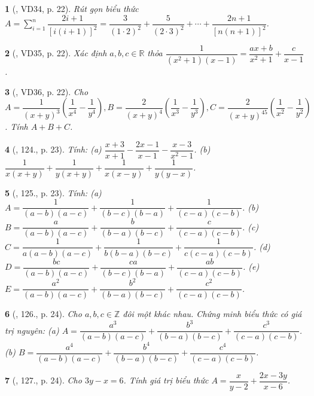\documentclass{article}
\newtheorem{baitoan}{}
\begin{document}
\begin{baitoan}[\cite{Binh_Toan_8_tap_1}, VD34, p. 22]
	Rút gọn biểu thức $A = \sum_{i=1}^n \dfrac{2i + 1}{[i(i + 1)]^2} = \dfrac{3}{(1\cdot2)^2} + \dfrac{5}{(2\cdot3)^2} + \cdots + \dfrac{2n + 1}{[n(n + 1)]^2}$.
\end{baitoan}

\begin{baitoan}[\cite{Binh_Toan_8_tap_1}, VD35, p. 22]
	Xác định $a,b,c\in\mathbb{R}$ thỏa $\dfrac{1}{(x^2 + 1)(x - 1)} = \dfrac{ax + b}{x^2 + 1} + \dfrac{c}{x - 1}$.
\end{baitoan}

\begin{baitoan}[\cite{Binh_Toan_8_tap_1}, VD36, p. 22]
	Cho $A = \dfrac{1}{(x + y)^3}\left(\dfrac{1}{x^4} - \dfrac{1}{y^4}\right),B = \dfrac{2}{(x + y)^4}\left(\dfrac{1}{x^3} - \dfrac{1}{y^3}\right),C = \dfrac{2}{(x + y)^45}\left(\dfrac{1}{x^2} - \dfrac{1}{y^2}\right)$. Tính $A + B + C$.
\end{baitoan}

\begin{baitoan}[\cite{Binh_Toan_8_tap_1}, 124., p. 23]
	Tính: (a) $\dfrac{x + 3}{x + 1} - \dfrac{2x - 1}{x - 1} - \dfrac{x - 3}{x^2 - 1}$. (b) $\dfrac{1}{x(x + y)} + \dfrac{1}{y(x + y)} + \dfrac{1}{x(x - y)} + \dfrac{1}{y(y - x)}$.
\end{baitoan}

\begin{baitoan}[\cite{Binh_Toan_8_tap_1}, 125., p. 23]
	Tính: (a) $A = \dfrac{1}{(a - b)(a - c)} + \dfrac{1}{(b - c)(b - a)} + \dfrac{1}{(c - a)(c - b)}$. (b) $B = \dfrac{a}{(a - b)(a - c)} + \dfrac{b}{(b - a)(b - c)} + \dfrac{c}{(c - a)(c - b)}$. (c) $C = \dfrac{1}{a(a - b)(a - c)} + \dfrac{1}{b(b - a)(b - c)} + \dfrac{1}{c(c - a)(c - b)}$. (d) $D = \dfrac{bc}{(a - b)(a - c)} + \dfrac{ca}{(b - c)(b - a)} + \dfrac{ab}{(c - a)(c - b)}$. (e) $E = \dfrac{a^2}{(a - b)(a - c)} + \dfrac{b^2}{(b - a)(b - c)} + \dfrac{c^2}{(c - a)(c - b)}$.
\end{baitoan}

\begin{baitoan}[\cite{Binh_Toan_8_tap_1}, 126., p. 24]
	Cho $a,b,c\in\mathbb{Z}$ đôi một khác nhau. Chứng minh biểu thức có giá trị nguyên: (a) $A = \dfrac{a^3}{(a - b)(a - c)} + \dfrac{b^3}{(b - a)(b - c)} + \dfrac{c^3}{(c - a)(c - b)}$. (b) $B = \dfrac{a^4}{(a - b)(a - c)} + \dfrac{b^4}{(b - a)(b - c)} + \dfrac{c^4}{(c - a)(c - b)}$.
\end{baitoan}

\begin{baitoan}[\cite{Binh_Toan_8_tap_1}, 127., p. 24]
	Cho $3y - x = 6$. Tính giá trị biểu thức $A = \dfrac{x}{y - 2} + \dfrac{2x - 3y}{x - 6}$.
\end{baitoan}
\end{document}
